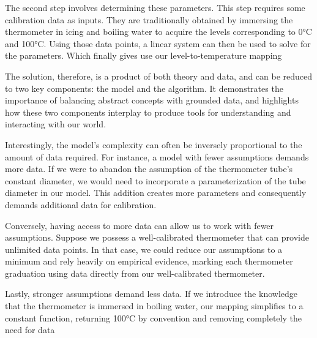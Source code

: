 \begin{bibunit}
The second step involves determining these parameters. This step requires some calibration data as inputs. They are traditionally obtained by immersing the thermometer in icing and boiling water to acquire the levels corresponding to 0°C and 100°C.
  Using those data points, a linear system can then be used to solve for the parameters. Which finally gives use our level-to-temperature mapping


The solution, therefore, is a product of both theory and data, and can be reduced to two key components: the model and the algorithm. It demonstrates the importance of balancing abstract concepts with grounded data, and highlights how these two components interplay to produce tools for understanding and interacting with our world.

Interestingly, the model's complexity can often be inversely proportional to the amount of data required. For instance, a model with fewer assumptions demands more data. If we were to abandon the assumption of the thermometer tube's constant diameter, we would need to incorporate a parameterization of the tube diameter in our model. This addition creates more parameters and consequently demands additional data for calibration.

Conversely, having access to more data can allow us to work with fewer assumptions. Suppose we possess a well-calibrated thermometer that can provide unlimited data points. In that case, we could reduce our assumptions to a minimum and rely heavily on empirical evidence, marking each thermometer graduation using data directly from our well-calibrated thermometer.

Lastly, stronger assumptions demand less data. If we introduce the knowledge that the thermometer is immersed in boiling water, our mapping simplifies to a constant function, returning 100°C by convention and removing completely the need for data


\end{bibunit}
